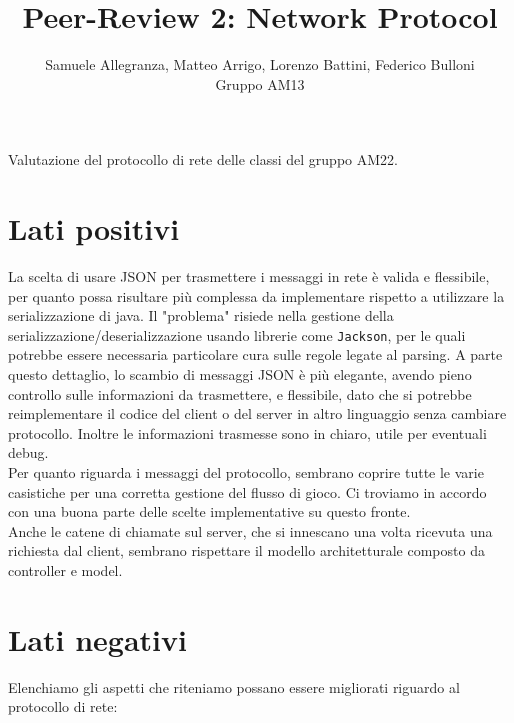 \documentclass[12pt]{article}
\title{Peer-Review 2: Network Protocol}
\author{Samuele Allegranza, Matteo Arrigo, Lorenzo Battini, Federico Bulloni\\Gruppo AM13}
\begin{document}
\maketitle

Valutazione del protocollo di rete delle classi del gruppo AM22.

\section{Lati positivi}
La scelta di usare JSON per trasmettere i messaggi in rete è valida e flessibile, per quanto possa risultare più complessa da implementare rispetto a utilizzare la serializzazione di java.
Il "problema" risiede nella gestione della serializzazione/deserializzazione usando librerie come \texttt{Jackson}, per le quali potrebbe essere necessaria particolare cura sulle regole legate al parsing.
A parte questo dettaglio, lo scambio di messaggi JSON è più elegante, avendo pieno controllo sulle informazioni da trasmettere, e flessibile, dato che si potrebbe reimplementare il codice del client o del server in altro linguaggio senza cambiare protocollo. Inoltre le informazioni trasmesse sono in chiaro, utile per eventuali debug.\\
Per quanto riguarda i messaggi del protocollo, sembrano coprire tutte le varie casistiche per una corretta gestione del flusso di gioco. Ci troviamo in accordo con una buona parte delle scelte implementative su questo fronte.\\
Anche le catene di chiamate sul server, che si innescano una volta ricevuta una richiesta dal client, sembrano rispettare il modello architetturale composto da controller e model.

\section{Lati negativi}
Elenchiamo gli aspetti che riteniamo possano essere migliorati riguardo al protocollo di rete:
\end{document}
